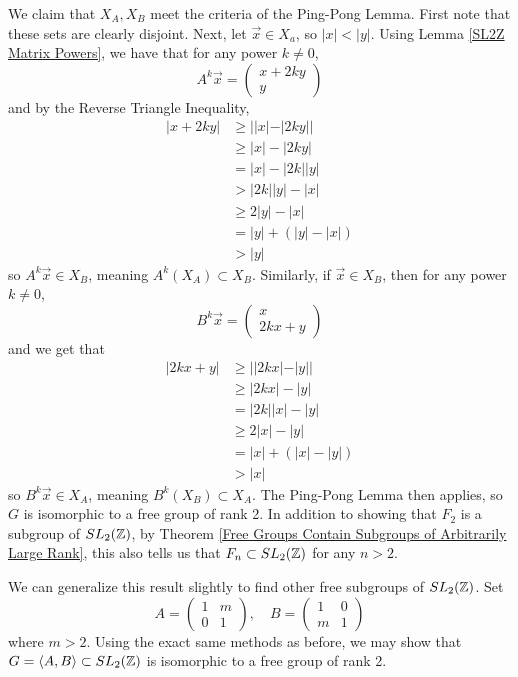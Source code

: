 We claim that $X_A, X_B$ meet the criteria of the Ping-Pong Lemma. First note that these sets are clearly disjoint. Next, let $\vec{x} \in X_a$, so $|x| < |y|$. Using Lemma \ref{SL2Z Matrix Powers}, we have that for any power $k \neq 0$,
\[A^k\vec{x} = \begin{pmatrix}
    x + 2ky \\ y
\end{pmatrix}\]
and by the Reverse Triangle Inequality,
\begin{align*}
    |x + 2ky| & \geq ||x| - |2ky|| \\
              & \geq |x| - |2ky| \\
              & = |x| - |2k||y| \\
              & > |2k||y| - |x| \\
              & \geq 2|y| - |x| \\
              & = |y| + (|y| - |x|) \\
              & > |y| \tag{$|y| - |x| > 0$}
\end{align*}
so $A^k\vec{x} \in X_B$, meaning $A^k(X_A) \subset X_B$. Similarly, if $\vec{x} \in X_B$, then for any power $k \neq 0$,
\[B^k\vec{x} = \begin{pmatrix}
    x \\ 2kx + y
\end{pmatrix}\]
and we get that 
\begin{align*}
    |2kx + y| & \geq ||2kx| - |y|| \\
              & \geq |2kx| - |y| \\
              & = |2k||x| - |y| \\
              & \geq 2|x| - |y| \\
              & = |x| + (|x| - |y|) \\
              & > |x| \tag{$|x| - |y| > 0$}
\end{align*}
so $B^k\vec{x} \in X_A$, meaning $B^k(X_B) \subset X_A$. The Ping-Pong Lemma then applies, so $G$ is isomorphic to a free group of rank 2. In addition to showing that $F_2$ is a subgroup of $SL_2(\mathbb{Z})$, by Theorem \ref{Free Groups Contain Subgroups of Arbitrarily Large Rank}, this also tells us that $F_n \subset SL_2(\mathbb{Z})$ for any $n > 2$. 

We can generalize this result slightly to find other free subgroups of $SL_2(\mathbb{Z})$. Set
\[A = \begin{pmatrix}
    1 & m \\ 0 & 1
\end{pmatrix}, \quad B = \begin{pmatrix}
    1 & 0 \\ m & 1
\end{pmatrix}\]
where $m > 2$. Using the exact same methods as before, we may show that $G = \langle A,B \rangle \subset SL_2(\mathbb{Z})$ is isomorphic to a free group of rank 2.